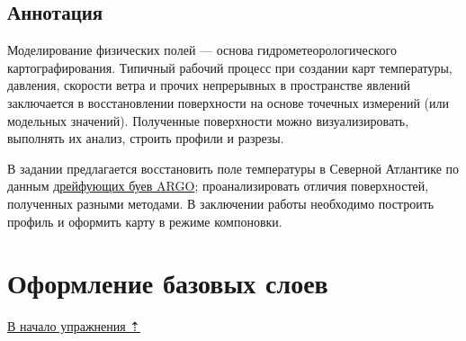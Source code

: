 \documentclass[]{book}
\theoremstyle{definition}
\theoremstyle{definition}
\theoremstyle{definition}
\theoremstyle{remark}
\begin{document}
\hypertarget{interpolation-annotation}{%
\subsection{Аннотация}\label{interpolation-annotation}}

Моделирование физических полей --- основа гидрометеорологического
картографирования. Типичный рабочий процесс при создании карт
температуры, давления, скорости ветра и прочих непрерывных в
пространстве явлений заключается в восстановлении поверхности на основе
точечных измерений (или модельных значений). Полученные поверхности
можно визуализировать, выполнять их анализ, строить профили и разрезы.

В задании предлагается восстановить поле температуры в Северной
Атлантике по данным \href{http://www.argo.ucsd.edu}{дрейфующих буев
ARGO}; проанализировать отличия поверхностей, полученных разными
методами. В заключении работы необходимо построить профиль и оформить
карту в режиме компоновки.

\hypertarget{interpolation-base}{%
\section{Оформление базовых слоев}\label{interpolation-base}}

\protect\hyperlink{interpolation}{В начало упражнения ⇡}
\end{document}
